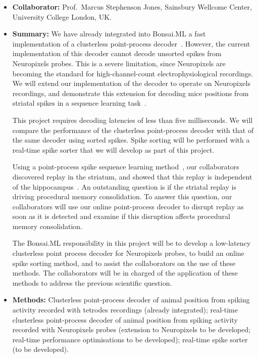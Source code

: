 \begin{itemize}

    \item\textbf{Collaborator:} Prof.~Marcus Stephenson Jones, Sainsbury
        Wellcome Center, University College London, UK.

    \item\textbf{Summary:} We have already integrated into Bonsai.ML a fast
        implementation of a clusterless point-process decoder~\citep[i.e., a
        decoder that does not require spike sorting and is suitable for
        real-time usage;][]{denovellisEtAl21}. However, the current
        implementation of this decoder cannot decode unsorted spikes from
        Neuropixels probes.
        This is a severe limitation, since Neuropixels are becoming the
        standard for high-channel-count electrophysiological recordings.
        We will extend our implementation of the decoder to operate on
        Neuropixels recordings, and demonstrate this extension for decoding
        mice positions from striatal spikes in a sequence learning
        task~\citep{thompsonEtAl24}.

        This project requires decoding latencies of less than five
        milliseconds. We will compare the performance of the clusterless
        point-process decoder with that of the same decoder using sorted
        spikes.
        Spike sorting will be performed with a real-time spike sorter that we
        will develop as part of this project.

        Using a point-process spike sequence learning
        method~\citep{williamsEtAl20}, our collaborators discovered replay in
        the striatum, and showed that this replay is independent of the
        hippocampus~\citep{thompsonEtAl24}. An outstanding question is if the
        striatal replay is driving procedural memory consolidation. To answer
        this question, our collaborators will use our online point-process
        decoder to disrupt replay as soon as it is detected and examine if this
        disruption affects procedural memory consolidation.

        The Bonsai.ML responsibility in this project will be to develop a
        low-latency clusterless point process decoder for Neuropixels probes,
        to build an online spike sorting method, and to assist the
        collaborators on the use of these methods. The collaborators will be
        in charged of the application of these methods to address the previous
        scientific question.

    \item\textbf{Methods:} Clusterless point-process decoder of animal position
        from spiking activity recorded with tetrodes recordings (already
        integrated); real-time clusterless point-process decoder of animal
        position from spiking activity recorded with Neuropixels probes
        (extension to Neuropixels to be developed; real-time performance
        optimisations to be developed); real-time spike sorter (to be
        developed).

\end{itemize}

